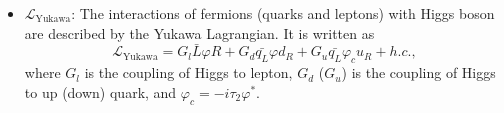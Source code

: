 \begin{itemize} [leftmargin=*]
\item \textbf{$\mathcal{L}_\text{Yukawa}$}: The interactions of fermions (quarks and leptons) with 
Higgs boson are described by the Yukawa Lagrangian. It is written as 
\begin{equation}
\mathcal{L}_\text{Yukawa} =  G_l\bar L \varphi R + G_d \bar{q_L} \varphi d_R +G_u \bar{q_L} \varphi_c u_R + h.c.,
\end{equation}
where $G_l$ is the coupling of Higgs to lepton, $G_d$ ($G_u$) is the coupling
of Higgs to up (down) quark, and $\varphi_c = -i\tau_2\varphi^{\text{*}}$. 
\end{itemize}
